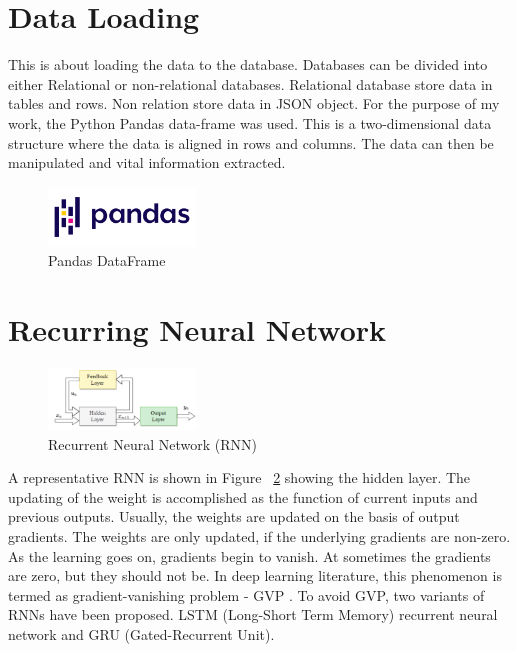 \section{Data Loading}

This is about loading the data to the database. Databases can be divided into either Relational or non-relational databases. Relational database store data in tables and rows. Non relation store data in JSON object. For the purpose of my work, the Python Pandas data-frame was used. This is a two-dimensional data structure where the data is aligned in rows and columns. The data can then be manipulated and vital information extracted.

\begin{figure}[h!]
	\centering
	\includegraphics[width=0.35\textwidth]{fig/panda.png}
	\caption{Pandas DataFrame}
	\label{fig:panda}
\end{figure}


\section{Recurring Neural Network}
\begin{figure}[h!]
	\centering
	\includegraphics[width=0.35\textwidth]{fig/rnn.png}
	\caption{Recurrent Neural Network (RNN)}
	\label{fig:rnn}
\end{figure}
A representative RNN is shown in Figure ~\ref{fig:rnn} showing the hidden layer. The updating of the weight is accomplished as the function of current inputs and previous outputs. Usually, the weights are updated on the basis of output gradients. The weights are only updated, if the underlying gradients are non-zero. As the learning goes on, gradients begin to vanish. At sometimes the gradients are zero, but they should not be. In deep learning literature, this phenomenon is termed as gradient-vanishing problem - GVP \cite{haykin2009neural}. To avoid GVP, two variants of RNNs have been proposed. LSTM (Long-Short Term Memory) recurrent neural network and GRU (Gated-Recurrent Unit).


